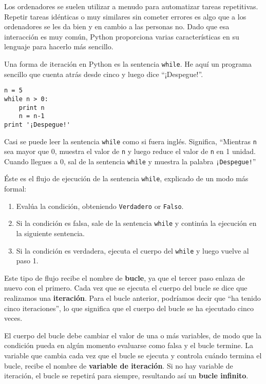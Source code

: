 Los ordenadores se suelen utilizar a menudo para automatizar tareas repetitivas. Repetir
tareas idénticas o muy similares sin cometer errores es algo que a los
ordenadores se les da bien y en cambio a las personas no.
Dado que esa interacción es muy común, Python proporciona varias
características en su lenguaje para hacerlo más sencillo.

Una forma de iteración en Python es la sentencia {\tt while}. He aquí un
programa sencillo que cuenta atrás desde cinco y luego dice ``¡Despegue!''.

\beforeverb
\begin{verbatim}
n = 5
while n > 0:
    print n
    n = n-1
print '¡Despegue!'
\end{verbatim}
\afterverb
%
Casi se puede leer la sentencia {\tt while} como si fuera inglés.
Significa, ``Mientras {\tt n} sea mayor que 0,
muestra el valor de {\tt n} y luego reduce el valor de {\tt n}
en 1 unidad. Cuando llegues a 0, sal de la sentencia {\tt while} y
muestra la palabra {\tt ¡Despegue!}''


Éste es el flujo de ejecución de la sentencia {\tt while}, explicado de un modo más formal:

\begin{enumerate}

\item Evalúa la condición, obteniendo {\tt Verdadero} or {\tt Falso}.

\item Si la condición es falsa, sale de la sentencia {\tt while}
y continúa la ejecución en la siguiente sentencia.

\item Si la condición es verdadera, ejecuta el
cuerpo del {\tt while} y luego vuelve al paso 1.

\end{enumerate}

Este tipo de flujo recibe el nombre de {\bf bucle}, ya que el tercer paso
enlaza de nuevo con el primero. Cada vez que se ejecuta el cuerpo del
bucle se dice que realizamos una {\bf iteración}. Para el bucle anterior,
podríamos decir que ``ha tenido cinco iteraciones'', lo que significa que el cuerpo
del bucle se ha ejecutado cinco veces.


El cuerpo del bucle debe cambiar el valor de una o más variables,
de modo que la condición pueda en algún momento evaluarse como falsa
y el bucle termine.
La variable que cambia cada vez que el bucle se ejecuta
y controla cuándo termina el bucle, recibe el nombre de
{\bf variable de iteración}.
Si no hay variable de iteración, el bucle se repetirá para siempre,
resultando así un {\bf bucle infinito}.

